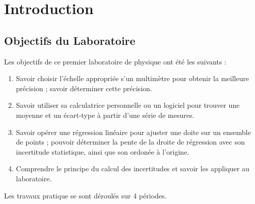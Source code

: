 \section*{Introduction}

\subsection*{Objectifs du Laboratoire}

Les objectifs de ce premier laboratoire de physique ont été les suivants :

\begin{enumerate}  
\item Savoir choisir l'échelle appropriée s'un multimètre pour obtenir la meilleure précision ; savoir déterminer cette précision. 
\item Savoir utiliser sa calculatrice personnelle ou un logiciel pour trouver une moyenne et un écart-type à partir d'une série de mesures.
\item Savoir opérer une régression linéaire pour ajuster une doite sur un ensemble de points ; pouvoir déterminer la pente de la droite de régression avec son incertitude statistique, ainsi que son ordonée à l'origine.
\item Comprendre le principe du calcul des incertitudes et savoir les appliquer au laboratoire.
\end{enumerate}

Les travaux pratique se sont déroulés sur 4 périodes.
